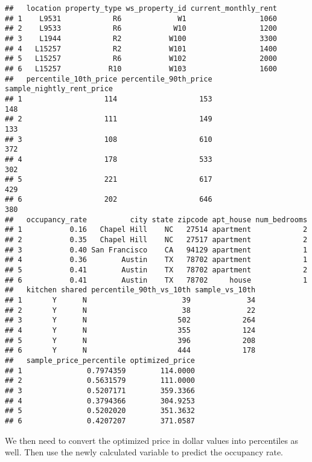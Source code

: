 \documentclass[]{article}
\begin{document}
\begin{verbatim}
##   location property_type ws_property_id current_monthly_rent
## 1    L9531            R6             W1                 1060
## 2    L9533            R6            W10                 1200
## 3    L1944            R2           W100                 3300
## 4   L15257            R2           W101                 1400
## 5   L15257            R6           W102                 2000
## 6   L15257           R10           W103                 1600
##   percentile_10th_price percentile_90th_price sample_nightly_rent_price
## 1                   114                   153                       148
## 2                   111                   149                       133
## 3                   108                   610                       372
## 4                   178                   533                       302
## 5                   221                   617                       429
## 6                   202                   646                       380
##   occupancy_rate          city state zipcode apt_house num_bedrooms
## 1           0.16   Chapel Hill    NC   27514 apartment            2
## 2           0.35   Chapel Hill    NC   27517 apartment            2
## 3           0.40 San Francisco    CA   94129 apartment            1
## 4           0.36        Austin    TX   78702 apartment            1
## 5           0.41        Austin    TX   78702 apartment            2
## 6           0.41        Austin    TX   78702     house            1
##   kitchen shared percentile_90th_vs_10th sample_vs_10th
## 1       Y      N                      39             34
## 2       Y      N                      38             22
## 3       Y      N                     502            264
## 4       Y      N                     355            124
## 5       Y      N                     396            208
## 6       Y      N                     444            178
##   sample_price_percentile optimized_price
## 1               0.7974359        114.0000
## 2               0.5631579        111.0000
## 3               0.5207171        359.3366
## 4               0.3794366        304.9253
## 5               0.5202020        351.3632
## 6               0.4207207        371.0587
\end{verbatim}

We then need to convert the optimized price in dollar values into
percentiles as well. Then use the newly calculated variable to predict
the occupancy rate.
\end{document}

